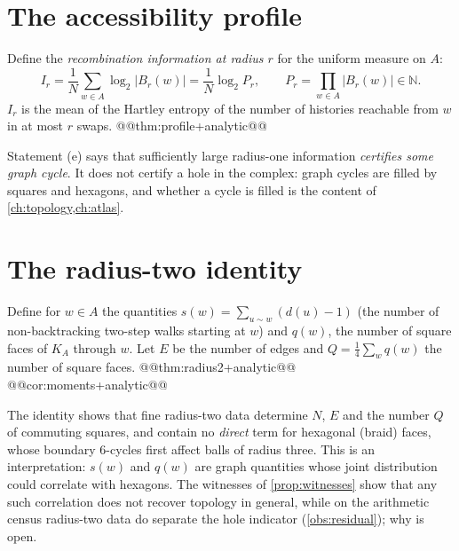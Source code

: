 \section{The accessibility profile}\label{sec:profile}
Define the \emph{recombination information at radius $r$} for the uniform measure on $A$:
\[
I_r=\frac1N\sum_{w\in A}\log_2|B_r(w)|=\frac1N\log_2P_r,\qquad P_r=\prod_{w\in A}|B_r(w)|\in\mathbb N .
\]
$I_r$ is the mean of the Hartley entropy of the number of histories reachable from $w$ in at most $r$ swaps.
@@thm:profile+analytic@@
\begin{remark}
Statement (e) says that sufficiently large radius-one information \emph{certifies some graph cycle}. It does not certify a hole in the complex: graph cycles are filled by squares and hexagons, and whether a cycle is filled is the content of \cref{ch:topology,ch:atlas}.
\end{remark}

\section{The radius-two identity}\label{sec:radius2}
Define for $w\in A$ the quantities $s(w)=\sum_{u\sim w}(d(u)-1)$ (the number of non-backtracking two-step walks starting at $w$) and $q(w)$, the number of square faces of $K_A$ through $w$. Let $E$ be the number of edges and $Q=\tfrac14\sum_wq(w)$ the number of square faces.
@@thm:radius2+analytic@@
@@cor:moments+analytic@@
\begin{remark}
The identity shows that fine radius-two data determine $N$, $E$ and the number $Q$ of commuting squares, and contain no \emph{direct} term for hexagonal (braid) faces, whose boundary $6$-cycles first affect balls of radius three. This is an interpretation: $s(w)$ and $q(w)$ are graph quantities whose joint distribution could correlate with hexagons. The witnesses of \cref{prop:witnesses} show that any such correlation does not recover topology in general, while on the arithmetic census radius-two data do separate the hole indicator (\cref{obs:residual}); why is open.
\end{remark}

